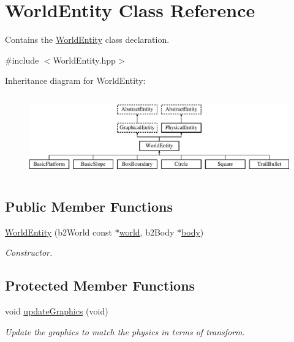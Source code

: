 \hypertarget{class_world_entity}{}\section{World\+Entity Class Reference}
\label{class_world_entity}


Contains the \hyperlink{class_world_entity}{World\+Entity} class declaration.  




{\ttfamily \#include $<$World\+Entity.\+hpp$>$}

Inheritance diagram for World\+Entity\+:\begin{figure}[H]
\begin{center}
\leavevmode
\includegraphics[height=3.522013cm]{class_world_entity}
\end{center}
\end{figure}
\subsection*{Public Member Functions}
\begin{DoxyCompactItemize}
\item 
\hyperlink{class_world_entity_ad41912aa528f517bbed6c0e60f4f8c52}{World\+Entity} (b2\+World const $\ast$\hyperlink{class_physical_entity_ae6c23c3817c4d7f9a867abed05cd7834}{world}, b2\+Body $\ast$\hyperlink{class_physical_entity_a91a5016393dd890c490b329abd938ec7}{body})
\begin{DoxyCompactList}\small\item\em Constructor. \end{DoxyCompactList}\end{DoxyCompactItemize}
\subsection*{Protected Member Functions}
\begin{DoxyCompactItemize}
\item 
void \hyperlink{class_world_entity_a526ecc62c6bf6703a197cd35840125ef}{update\+Graphics} (void)
\begin{DoxyCompactList}\small\item\em Update the graphics to match the physics in terms of transform. \end{DoxyCompactList}\end{DoxyCompactItemize}
